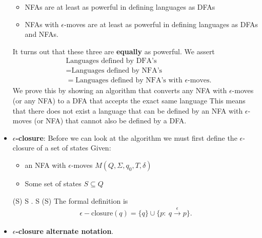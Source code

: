 \documentclass{report}
\begin{document}
\begin{itemize}
\begin{itemize}
                \item NFAs are at least as powerful in defining languages as DFAs
                \item NFAs with $\epsilon$-moves are at least as powerful in defining languages as DFAs and NFAs.
            \end{itemize}
            \bigbreak \noindent 
            It turns out that these three are \textbf{equally} as powerful. We assert
            \begin{align*}
                &\text{Languages defined by DFA's} \\
                &=\text{Languages defined by NFA's} \\
                &=\text{Languages defined by NFA's with $\epsilon$-moves}
            .\end{align*}
            We prove this by showing an algorithm that converts any NFA with $\epsilon$-moves (or any NFA) to a DFA that accepts the exact same language
            \bigbreak \noindent 
            This means that there does not exist a language that can be defined by an NFA with $\epsilon$-moves (or NFA) that cannot also be defined by a DFA.
        \item \textbf{$\epsilon$-closure}: Before we can look at the algorithm we must first define the $\epsilon$-closure of a set of states 
            \bigbreak \noindent 
            Given:
            \begin{itemize}
                \item an NFA with $\epsilon$-moves $M(Q, \Sigma, q_{0}, T, \delta) $
                \item Some set of states $S \subseteq Q$
            \end{itemize}
            \bigbreak \noindent 
             \varepsilon{}(S)  S  \varepsilon{} \delta.
            \bigbreak \noindent 
             S \subseteq \varepsilon{}(S)
            \bigbreak \noindent 
            The formal definition is
            \begin{align*}
                \epsilon-\text{closure}(q) = \{q\} \cup \{p:\ q \xrightarrow{\epsilon} p\}
            .\end{align*}
        \item \textbf{$\epsilon$-closure alternate notation}. 
            \begin{align*}

\end{align*}
\end{itemize}
\end{document}
